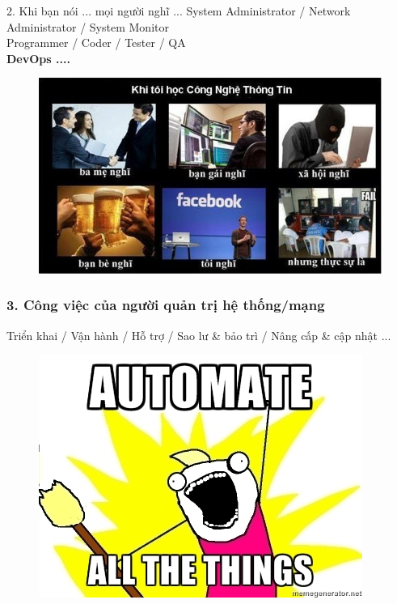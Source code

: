 \documentclass[12pt]{beamer}
\begin{document}
\begin{frame}{2. Khi bạn nói ... mọi người nghĩ ...}
System Administrator / Network Administrator / System Monitor \\
Programmer / Coder / Tester / QA  \\
\textbf{DevOps ....}
\framebreak
\pause
\begin{figure}[!ht]
\centering
			\includegraphics[scale=0.5]{khibannoi}
\end{figure}

\end{frame}
\label{Python & Cong viec}
\begin{frame}
\frametitle{3. Công việc của người quản trị hệ thống/mạng}
Triển khai / Vận hành / Hỗ trợ / Sao lư \& bảo trì / Nâng cấp \& cập nhật ...\\
\framebreak
\pause
\begin{figure}[!ht]
\centering
			\includegraphics[scale=0.5]{automate-all-the-things}
\end{figure}
\end{frame}
\end{document}
